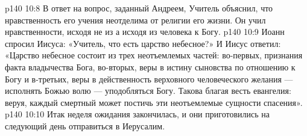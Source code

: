 \vs p140 10:8 В ответ на вопрос, заданный Андреем, Учитель объяснил, что нравственность его учения неотделима от религии его жизни. Он учил нравственности, исходя не из  а исходя из  человека к Богу.
\vs p140 10:9 \pc Иоанн спросил Иисуса: «Учитель, что есть царство небесное?» И Иисус ответил: «Царство небесное состоит из трех неотъемлемых частей: во\hyp{}первых, признания факта владычества Бога, во\hyp{}вторых, веры в истину сыновства по отношению к Богу и в\hyp{}третьих, веры в действенность верховного человеческого желания --- исполнять Божью волю --- уподобляться Богу. Такова благая весть евангелия: веруя, каждый смертный может постичь эти неотъемлемые сущности спасения».
\vs p140 10:10 \pc Итак неделя ожидания закончилась, и они приготовились на следующий день отправиться в Иерусалим.
